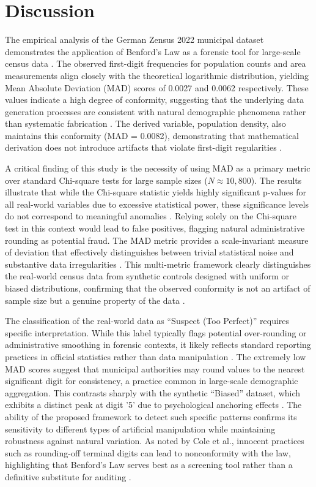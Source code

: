 \documentclass[11pt,a4paper]{article}
\begin{document}
\section{Discussion}
The empirical analysis of the German Zensus 2022 municipal dataset demonstrates the application of Benford's Law as a forensic tool for large-scale census data \cite{Ivanova2025BenfordsLA}. The observed first-digit frequencies for population counts and area measurements align closely with the theoretical logarithmic distribution, yielding Mean Absolute Deviation (MAD) scores of 0.0027 and 0.0062 respectively. These values indicate a high degree of conformity, suggesting that the underlying data generation processes are consistent with natural demographic phenomena rather than systematic fabrication \cite{Petras2025DetectingBL}. The derived variable, population density, also maintains this conformity (MAD = 0.0082), demonstrating that mathematical derivation does not introduce artifacts that violate first-digit regularities \cite{Morales2022BenfordsLF}.

A critical finding of this study is the necessity of using MAD as a primary metric over standard Chi-square tests for large sample sizes ($N \approx 10,800$). The results illustrate that while the Chi-square statistic yields highly significant p-values for all real-world variables due to excessive statistical power, these significance levels do not correspond to meaningful anomalies \cite{Kossovsky2021OnTM}. Relying solely on the Chi-square test in this context would lead to false positives, flagging natural administrative rounding as potential fraud. The MAD metric provides a scale-invariant measure of deviation that effectively distinguishes between trivial statistical noise and substantive data irregularities \cite{Cerqueti2021SomeNT}. This multi-metric framework clearly distinguishes the real-world census data from synthetic controls designed with uniform or biased distributions, confirming that the observed conformity is not an artifact of sample size but a genuine property of the data \cite{Kossler2024SomeNI}.

The classification of the real-world data as ``Suspect (Too Perfect)'' requires specific interpretation. While this label typically flags potential over-rounding or administrative smoothing in forensic contexts, it likely reflects standard reporting practices in official statistics rather than data manipulation \cite{Azevedo2021ABL}. The extremely low MAD scores suggest that municipal authorities may round values to the nearest significant digit for consistency, a practice common in large-scale demographic aggregation. This contrasts sharply with the synthetic ``Biased'' dataset, which exhibits a distinct peak at digit '5' due to psychological anchoring effects \cite{Josic2020TheAO}. The ability of the proposed framework to detect such specific patterns confirms its sensitivity to different types of artificial manipulation while maintaining robustness against natural variation. As noted by Cole et al., innocent practices such as rounding-off terminal digits can lead to nonconformity with the law, highlighting that Benford's Law serves best as a screening tool rather than a definitive substitute for auditing \cite{Cole2019TestingTE}.
\end{document}
